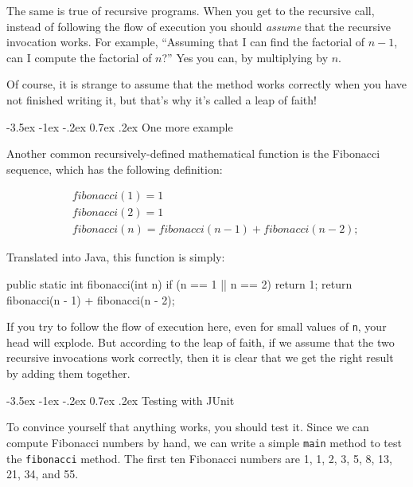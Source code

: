 \documentclass[12pt]{book}
\makeatletter
\theoremstyle{exercise}
\newcommand{\java}[1]{\verb"#1"}
\renewcommand{\section}{\@startsection{section}{1}{\z@}%
    {-3.5ex \@plus -1ex \@minus -.2ex}%
    {0.7ex \@plus.2ex}%
    {\normalfont\Large\bfseries}}
\newcommand{\java}[1]{\lstinline{#1}} %
\makeatother
\begin{document}
The same is true of recursive programs.
When you get to the recursive call, instead of following the flow of execution you should {\em assume} that the recursive invocation works.
For example, ``Assuming that I can find the factorial of $n-1$, can I compute the factorial of $n$?''
Yes you can, by multiplying by $n$.

Of course, it is strange to assume that the method works correctly when you have not finished writing it, but that's why it's called a leap of faith!


\section{One more example}
\label{fibonacci}


Another common recursively-defined mathematical function is the Fibonacci sequence, which has the following definition:

\vspace{-1ex}
\begin{eqnarray*}
&& fibonacci(1) = 1 \\
&& fibonacci(2) = 1 \\
&& fibonacci(n) = fibonacci(n-1) + fibonacci(n-2);
\end{eqnarray*}
\vspace{-1ex}

Translated into Java, this function is simply:

\begin{code}
    public static int fibonacci(int n) {
        if (n == 1 || n == 2) {
            return 1;
        }
        return fibonacci(n - 1) + fibonacci(n - 2);
    }
\end{code}

If you try to follow the flow of execution here, even for small values of \java{n}, your head will explode.
But according to the leap of faith, if we assume that the two recursive invocations work correctly, then it is clear that we get the right result by adding them together.


\section{Testing with JUnit}
\label{JUnit}

To convince yourself that anything works, you should test it.
Since we can compute Fibonacci numbers by hand, we can write a simple \java{main} method to test the \java{fibonacci} method.
The first ten Fibonacci numbers are 1, 1, 2, 3, 5, 8, 13, 21, 34, and 55.
\end{document}

